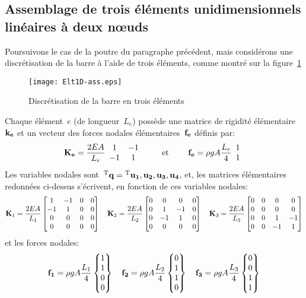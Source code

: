   \subsection{Assemblage de trois éléments unidimensionnels linéaires à deux nœuds}\label{Sec-ass}
\fi
Poursuivons le cas de la poutre du paragraphe précédent, mais considérons une discrétisation
de la barre à l'aide de trois éléments, comme montré sur la figure~\ref{fig-ex2ass}
\begin{figure}[ht]\centering
\texttt{[image: Elt1D-ass.eps]}
\caption{Discrétisation de la barre en trois éléments}\label{fig-ex2ass}
\end{figure}
\medskipvm
Chaque élément~$e$ (de longueur~$L_e$) possède une matrice de rigidité élémentaire~$\MM{k_e}$ 
et un vecteur des forces nodales élémentaires~$\VV{f_e}$ définis par:
\begin{equation}
\MM{K_e} = \frac{2EA}{L_e} \MM{\begin{array}{cc} 1 & -1\\ -1& 1 \end{array}}
\qquad \text{ et } \qquad
\VV{f_e} = \rho g A \frac{L_e}4 \VV{\begin{array}{c} 1 \\1 \end{array}}
\end{equation}
\medskipvm
Les variables nodales sont~${}^\mathrm{T}\mathbf{q}={}^\mathrm{T}\mathbf{u_1, u_2, u_3, u_4}$, et, les matrices élémentaires
redonnées ci-dessus s'écrivent, en fonction de ces variables nodales:
\begin{equation*}
\MM{K}_1 = \frac{2EA}{L_1} \MM*{1 & -1 & 0 & 0\\ -1& 1 & 0 & 0\\ 0&0&0&0\\0&0&0&0}
\quad
\MM{K}_2 = \frac{2EA}{L_2} \MM*{0&0&0&0\\ 0& 1 & -1 & 0\\ 0 & -1& 1& 0\\0&0&0&0}
\quad
\MM{K}_3 = \frac{2EA}{L_3} \MM*{0&0&0&0\\0&0&0&0\\0& 0& 1 & -1\\ 0&0 & -1& 1}
\end{equation*}
et les forces nodales:
\begin{equation*}
\VV{f_1} = \rho g A \frac{L_1}4 \VV*{1 \\1\\0\\0}
\quad
\VV{f_2} = \rho g A \frac{L_2}4 \VV*{0\\1 \\1\\0}
\quad
\VV{f_3} = \rho g A \frac{L_3}4 \VV*{0\\0\\1 \\1}
\end{equation*}
